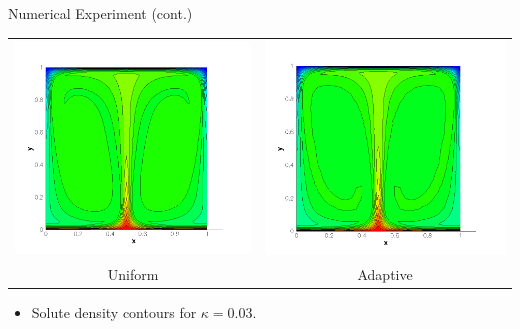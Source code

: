\documentclass[compress,12pt]{beamer}
\begin{document}
\begin{frame}{Numerical Experiment (cont.)}
    {
     \begin{center}\begin{tabular}{cc} \\
      \includegraphics[width=.5\textwidth]{figures/s_80x80_kappa_0_03}&
      \includegraphics[width=.5\textwidth]{figures/s_adapt_kappa_0_03}\\
      Uniform &
      Adaptive
     \end{tabular}\end{center}
     \begin{itemize}
       \item Solute density contours for $\kappa=0.03$.
     \end{itemize}
    }


\end{frame}
\end{document}
